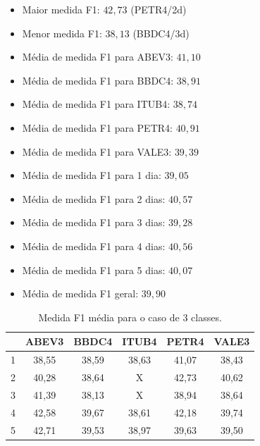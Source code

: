 \documentclass[grad,numbers]{coppe}
\begin{document}
				\begin{itemize}
	 				\item Maior medida F1: $42,73$ (PETR4/2d)
	 				\item Menor medida F1: $38,13$ (BBDC4/3d)
	 				\item Média de medida F1 para ABEV3: $41,10$
	 				\item Média de medida F1 para BBDC4: $38,91$
	 				\item Média de medida F1 para ITUB4: $38,74$
	 				\item Média de medida F1 para PETR4: $40,91$
	 				\item Média de medida F1 para VALE3: $39,39$
	 				\item Média de medida F1 para 1 dia: $39,05$
	 				\item Média de medida F1 para 2 dias: $40,57$
	 				\item Média de medida F1 para 3 dias: $39,28$
	 				\item Média de medida F1 para 4 dias: $40,56$
	 				\item Média de medida F1 para 5 dias: $40,07$
	 				\item Média de medida F1 geral: $39,90$
	 			\end{itemize}
	 			\begin{table}[h]
	 				\caption{Medida F1 média para o caso de 3 classes.}
	 				\label{tab:3c_f1_analysis}
	 				\centering
	 				{\footnotesize
	 					\begin{tabular}{|c|c|c|c|c|c|}
	 						\hline
	 						\diagbox[linewidth=0.2pt, width=\dimexpr \textwidth/10+2\tabcolsep\relax, height=0.8cm]{Dias}{Ativo}
	 						& ABEV3 & BBDC4 & ITUB4 & PETR4 & VALE3\\
	 						\hline
	 						1 & 38,55 & 38,59 & 38,63 & 41,07 & 38,43 \\
	 						2 & 40,28 & 38,64 & X     & 42,73 & 40,62 \\
	 						3 & 41,39 & 38,13 & X     & 38,94 & 38,64 \\
	 						4 & 42,58 & 39,67 & 38,61 & 42,18 & 39,74 \\
	 						5 & 42,71 & 39,53 & 38,97 & 39,63 & 39,50 \\
	 						\hline
	 				\end{tabular}}
	 			\end{table}
\end{document}
